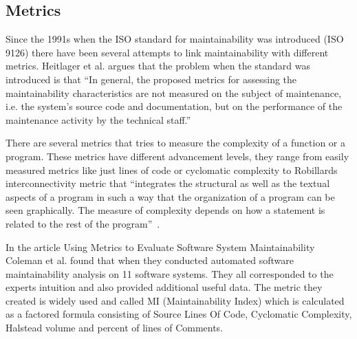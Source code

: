 \documentclass[conference, a4paper]{IEEEtran}
\begin{document}
\subsection{Metrics}

Since the 1991s when the ISO standard for maintainability was introduced (ISO 9126) there have been several attempts to link maintainability with different metrics. Heitlager et al. argues that the problem when the standard was introduced is that ``In general, the proposed metrics for assessing the maintainability characteristics are not measured on the subject of maintenance, i.e. the system’s source code and documentation, but on the performance of the maintenance activity by the technical staff.''~\cite{bibitem:Maintainability}

There are several metrics that tries to measure the complexity of a function or a program. These metrics have different advancement levels, they range from easily measured metrics like just lines of code or cyclomatic complexity to Robillards interconnectivity metric that ``integrates the structural as well as the textual aspects of a program in such a way that the organization of a program can be seen graphically. The measure of complexity depends on how a statement is related to the rest of the program''~\cite{bibitem:Robillard}.

In the article Using Metrics to Evaluate Software System Maintainability Coleman et al. found that when they conducted automated software maintainability analysis on 11 software systems. They all corresponded to the experts intuition and also provided additional useful data. The metric they created is widely used and called MI (Maintainability Index) which is calculated as a factored formula consisting of Source Lines Of Code, Cyclomatic Complexity, Halstead volume and percent of lines of Comments.~\cite{bibitem:MetricsToEvaluate}
\end{document}
